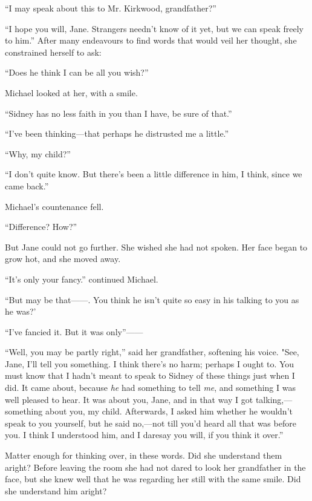 {}``I may speak about this to Mr. Kirkwood, grandfather?''

``I hope you will, Jane. Strangers needn't know of it yet, but we can
speak freely to him.'' After many endeavours to find words that would
veil her thought, she constrained herself to ask:

``Does he think I can be all you wish?''

Michael looked at her, with a smile.

``Sidney has no less faith in you than I have, be sure of that.''

``I've been thinking---that perhaps he distrusted me a little.''

``Why, my child?''

``I don't quite know. But there's been a little difference in him, I
think, since we came back.''

Michael's countenance fell.

``Difference? How?''

But Jane could not go further. She wished she had not spoken. Her face
began to grow hot, and she moved away.

``It's only your fancy.'' continued Michael.

{}``But may be {that{{------}}.} You think he isn't quite so easy in his
talking to you as he was?'

``I've fancied it. But it was {only''{{------}}}

``Well, you may be partly right,'' said her grandfather, softening his
voice. "See, Jane, I'll tell you something. I think there's no harm;
perhaps I ought to. You must know that I hadn't meant to speak to Sidney
of these things just when I did. It came about, because \emph{he} had
something to tell \emph{me}, and something I was well pleased to hear.
It was about you, Jane, and in that way I got talking,---something about
you, my child. Afterwards, I asked him whether he wouldn't speak to you
yourself, but he said no,---not till you'd heard all that was before
you. I think I understood him, and I daresay you will, if you think it
over.''

Matter enough for thinking over, in these words. Did she understand them
aright? Before leaving the room she had not dared to look her
grandfather in the face, but she knew well that he was regarding her
still with the same smile. Did she understand him aright?

